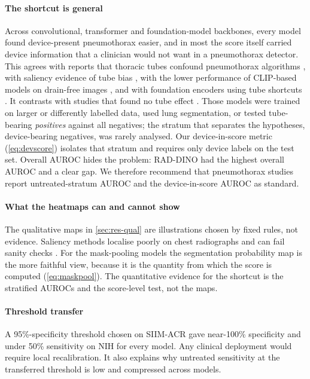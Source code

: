 \documentclass[final,3p]{elsarticle}
\begin{document}
\paragraph{The shortcut is general}
Across convolutional, transformer and foundation-model backbones, every model found device-present pneumothorax easier, and in most the score itself carried device information that a clinician would not want in a pneumothorax detector. This agrees with reports that thoracic tubes confound pneumothorax algorithms \citep{rueckel2020tubes,rueckel2021annotations}, with saliency evidence of tube bias \citep{wollek2023attention}, with the lower performance of CLIP-based models on drain-free images \citep{sourget2025clip}, and with foundation encoders using tube shortcuts \citep{li2025featurequality}. It contrasts with studies that found no tube effect \citep{thian2021external,seah2021hidden,graf2020tube}. Those models were trained on larger or differently labelled data, used lung segmentation, or tested tube-bearing \emph{positives} against all negatives; the stratum that separates the hypotheses, device-bearing negatives, was rarely analysed. Our device-in-score metric (\cref{eq:devscore}) isolates that stratum and requires only device labels on the test set. Overall AUROC hides the problem: RAD-DINO had the highest overall AUROC and a clear gap. We therefore recommend that pneumothorax studies report untreated-stratum AUROC and the device-in-score AUROC as standard.

\paragraph{What the heatmaps can and cannot show}
The qualitative maps in \cref{sec:res-qual} are illustrations chosen by fixed rules, not evidence. Saliency methods localise poorly on chest radiographs and can fail sanity checks \citep{saporta2022saliency,arun2021saliency}. For the mask-pooling models the segmentation probability map is the more faithful view, because it is the quantity from which the score is computed (\cref{eq:maskpool}). The quantitative evidence for the shortcut is the stratified AUROCs and the score-level test, not the maps.

\paragraph{Threshold transfer}
A 95\%-specificity threshold chosen on SIIM-ACR gave near-100\% specificity and under 50\% sensitivity on NIH for every model. Any clinical deployment would require local recalibration. It also explains why untreated sensitivity at the transferred threshold is low and compressed across models.
\end{document}
